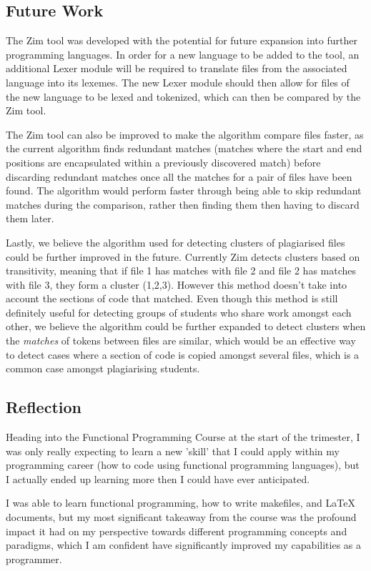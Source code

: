 \documentclass[11pt, a4paper]{article}
\begin{document}
\subsection{Future Work}
The Zim tool was developed with the potential for future expansion into further programming languages. In order for a new language to be added to the tool, an additional Lexer module will be required to translate files from the associated language into its lexemes. The new Lexer module should then allow for files of the new language to be lexed and tokenized, which can then be compared by the Zim tool.

The Zim tool can also be improved to make the algorithm compare files faster, as the current algorithm finds redundant matches (matches where the start and end positions are encapsulated within a previously discovered match) before discarding redundant matches once all the matches for a pair of files have been found. The algorithm would perform faster through being able to skip redundant matches during the comparison, rather then finding them then having to discard them later. 

Lastly, we believe the algorithm used for detecting clusters of plagiarised files could be further improved in the future. Currently Zim detects clusters based on transitivity, meaning that if file 1 has matches with file 2 and file 2 has matches with file 3, they form a cluster (1,2,3). However this method doesn't take into account the sections of code that matched. Even though this method is still definitely useful for detecting groups of students who share work amongst each other, we believe the algorithm could be further expanded to detect clusters when the \emph{matches} of tokens between files are similar,  which would be an effective way to detect cases where a section of code is copied amongst several files, which is a common case amongst plagiarising students. 

\subsection{Reflection}
Heading into the Functional Programming Course at the start of the trimester, I was only really expecting to learn a new 'skill' that I could apply within my programming career (how to code using functional programming languages), but I actually ended up learning more then I could have ever anticipated.

I was able to learn functional programming, how to write makefiles, and LaTeX documents, but my most significant takeaway from the course was the profound impact it had on my perspective towards different programming concepts and paradigms, which I am confident have significantly improved my capabilities as a programmer.
\end{document}
